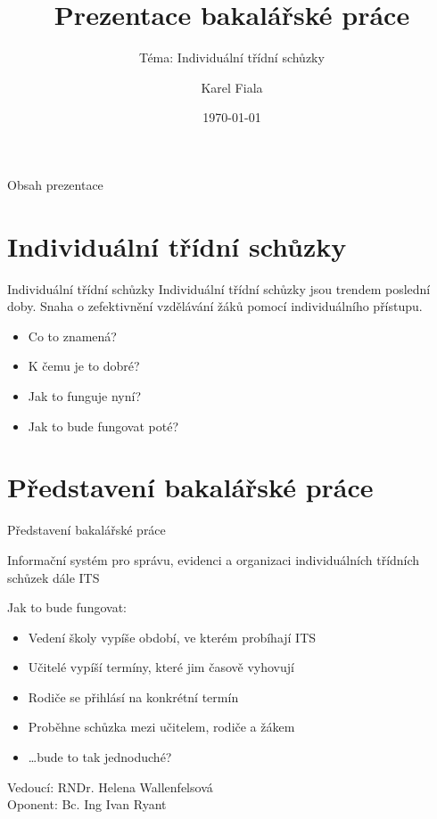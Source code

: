 \documentclass{beamer}
\title[BI-PPR - Projekt, prezentace, rétorika]{Prezentace bakalářské práce}
\subtitle[BI-PPR - Projekt, prezentace, rétorika]{Téma: Individuální třídní schůzky}
\author[Karel Fiala]{Karel Fiala}
\institute[ČVUT FIT]{
   Fakulta informačních technologií \\
   České vysoké učení technické v~Praze
 }
\date{\today}
\begin{document}
\begin{frame}
   \titlepage
\end{frame}


\begin{frame}{Obsah prezentace}
   \tableofcontents
\end{frame}


\section{Individuální třídní schůzky}
\begin{frame}{Individuální třídní schůzky}
Individuální třídní schůzky jsou trendem poslední doby. Snaha o zefektivnění vzdělávání žáků pomocí individuálního přístupu. \break
  \begin{itemize}
  \item Co to znamená? \break
  \item K čemu je to dobré? \break
  \item Jak to funguje nyní? \break
  \item Jak to bude fungovat poté? \break
  \end{itemize}
\end{frame}


\section{Představení bakalářské práce}
\begin{frame}{Představení bakalářské práce}

Informační systém pro správu, evidenci a organizaci individuálních třídních schůzek dále ITS \\ 
\begin{flushleft}
  Jak to bude fungovat:\\
    \begin{itemize}
    \item Vedení školy vypíše období, ve kterém probíhají ITS
    \item Učitelé vypíší termíny, které jim časově vyhovují
    \item Rodiče se přihlásí na konkrétní termín
    \item Proběhne schůzka mezi učitelem, rodiče a žákem
    \item \ldots bude to tak jednoduché?
    \end{itemize} 
\end{flushleft}

Vedoucí: RNDr. Helena Wallenfelsová \\
Oponent: Bc. Ing Ivan Ryant
\end{frame}
\end{document}
